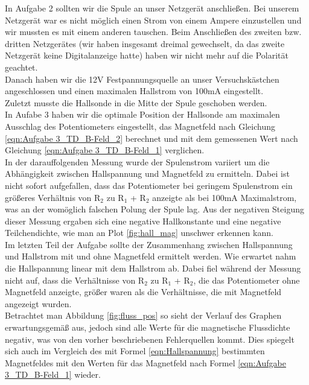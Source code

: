 \documentclass[12pt]{scrartcl}
\begin{document}
In Aufgabe 2 sollten wir die Spule an unser Netzgerät anschließen. Bei unserem Netzgerät war es nicht möglich einen Strom von einem Ampere einzustellen und wir mussten es mit einem anderen tauschen. Beim Anschließen des zweiten bzw. dritten Netzgerätes (wir haben insgesamt dreimal gewechselt, da das zweite Netzgerät keine Digitalanzeige hatte) haben wir nicht mehr auf die Polarität geachtet.\\
Danach haben wir die 12V Festpannungsquelle an unser Versuchskästchen angeschlossen und einen maximalen Hallstrom von 100mA eingestellt.\\
Zuletzt musste die Hallsonde in die Mitte der Spule geschoben werden.\\
In Aufabe 3 haben wir die optimale Position der Hallsonde am maximalen Ausschlag des Potentiometers eingestellt, das Magnetfeld nach Gleichung \ref{eqn:Aufgabe 3_TD_B-Feld_2} berechnet und mit dem gemessenen Wert nach Gleichung \ref{eqn:Aufgabe 3_TD_B-Feld_1} verglichen.\\
In der darauffolgenden Messung wurde der Spulenstrom variiert um die Abhängigkeit zwischen Hallspannung und Magnetfeld zu ermitteln. Dabei ist nicht sofort aufgefallen, dass das Potentiometer bei geringem Spulenstrom ein größeres Verhältnis von R$_2$ zu R$_1$ + R$_2$ anzeigte als bei 100mA Maximalstrom, was an der womöglich falschen Polung der Spule lag. Aus der negativen Steigung dieser Messung ergaben sich eine negative Hallkonstante und eine negative Teilchendichte, wie man an Plot \ref{fig:hall_mag}
unschwer erkennen kann.\\
Im letzten Teil der Aufgabe sollte der Zusammenhang zwischen Hallspannung und Hallstrom mit und ohne Magnetfeld ermittelt werden. Wie erwartet nahm die Hallspannung linear mit dem Hallstrom ab. Dabei fiel während der Messung nicht auf, dass die Verhältnisse von R$_2$ zu R$_1$ + R$_2$, die das Potentiometer ohne Magnetfeld anzeigte, größer waren als die Verhältnisse, die mit Magnetfeld angezeigt wurden.\\
Betrachtet man Abbildung \ref{fig:fluss_pos} so sieht der Verlauf des Graphen erwartungsgemäß aus, jedoch sind alle Werte für die magnetische Flussdichte negativ, was von den vorher beschriebenen Fehlerquellen kommt. Dies spiegelt sich auch im Vergleich des mit Formel \ref{eqn:Hallspannung} bestimmten Magnetfeldes mit den Werten für das Magnetfeld nach Formel \ref{eqn:Aufgabe 3_TD_B-Feld_1} wieder.
\end{document}
